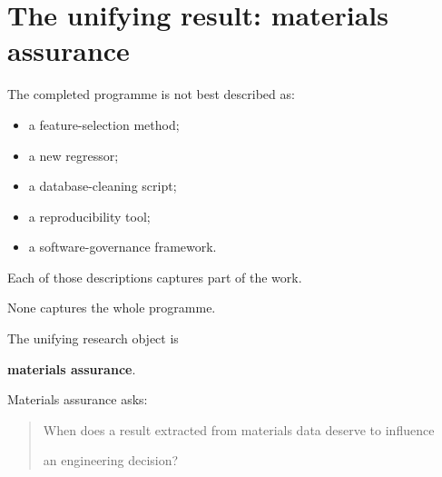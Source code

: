 \documentclass[11pt,a4paper,oneside]{report}
\providecommand{\term}[1]{\textbf{#1}}
\begin{document}
\section{The unifying result: materials assurance}



The completed programme is not best described as:



\begin{itemize}



\item

a feature-selection method;



\item

a new regressor;



\item

a database-cleaning script;



\item

a reproducibility tool;



\item

a software-governance framework.



\end{itemize}



Each of those descriptions captures part of the work.



None captures the whole programme.



The unifying research object is

\term{materials assurance}.



Materials assurance asks:



\begin{quote}



When does a result extracted from materials data deserve to influence

an engineering decision?



\end{quote}
\end{document}
